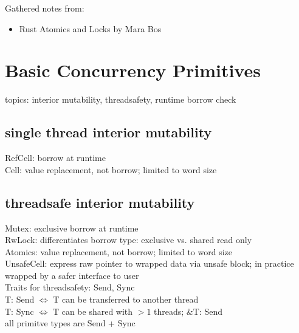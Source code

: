 \documentclass[8pt]{extarticle}
\begin{document}

  
\begin{multicols*}{2}

  Gathered notes from:
  \begin{itemize}
  \item Rust Atomics and Locks by Mara Bos \cite{rustatomicsbook}
  \end{itemize}
  
  \section{Basic Concurrency Primitives}
  topics: interior mutability, threadsafety, runtime borrow check

  \subsection{single thread interior mutability}
  RefCell: borrow at runtime\\
  Cell: value replacement, not borrow; limited to word size
  
  \subsection{threadsafe interior mutability}
  Mutex: exclusive borrow at runtime\\
  RwLock: differentiates borrow type: exclusive vs. shared read only\\
  Atomics: value replacement, not borrow; limited to word size\\

  UnsafeCell: express raw pointer to wrapped data via unsafe block; in practice wrapped by a safer interface to user\\

  Traits for threadsafety: Send, Sync\\
  T: Send $\iff$ T can be transferred to another thread\\
  T: Sync $\iff$ T can be shared with $>1$ threads; \&T: Send\\
  all primitve types are Send + Sync\\
  

\end{multicols*}
\end{document}
